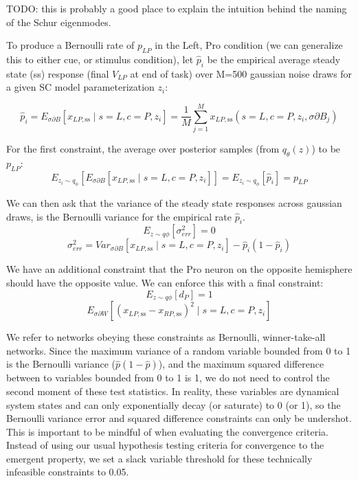 \documentclass[11pt]{article}
\begin{document}
TODO: this is probably a good place to explain the intuition behind the naming of the Schur eigenmodes.

To produce a Bernoulli rate of $p_{LP}$ in the Left, Pro condition (we can generalize this to either cue, or stimulus condition), let $\hat{p}_i$ be the empirical average steady state (ss) response (final $V_{LP}$ at end of task) over M=500 gaussian noise draws for a given SC model parameterization $z_i$:

\begin{equation}
 \hat{p}_i = E_{\sigma \partial B} \left[ x_{LP,\text{ss}} \mid s=L, c=P, z_i \right] = \frac{1}{M}\sum_{j=1}^M x_{LP,\text{ss}}(s=L, c=P, z_i, \sigma \partial B_j)
 \end{equation}

For the first constraint, the average over posterior samples (from $q_\theta(z)$) to be $p_{LP}$:
\begin{equation}
E_{z_i \sim q_\phi} \left[ E_{\sigma \partial B} \left[ x_{LP,\text{ss}} \mid s=L, c=P, z_i \right] \right] = E_{z_i \sim q_\phi} \left[ \hat{p}_i \right] = p_{LP}
\end{equation}

We can then ask that the variance of the steady state responses across gaussian draws, is the Bernoulli variance for the empirical rate $\hat{p}_i$.
\begin{equation}
E_{z \sim q\phi} \left[ \sigma^2_{err} \right] = 0
\end{equation}
\begin{equation}
\sigma^2_{err} = Var_{\sigma \partial B} \left[ x_{LP,\text{ss}} \mid s=L, c=P, z_i \right] - \hat{p}_i(1 - \hat{p}_i)
\end{equation}

We have an additional constraint that the Pro neuron on the opposite hemisphere should have the opposite value.  We can enforce this with a final constraint:
\begin{equation}
E_{z \sim q\phi} \left[ d_P \right] = 1
\end{equation}
\begin{equation}
E_{\sigma \partial W} \left[ (x_{LP,\text{ss}} - x_{RP,\text{ss}})^2  \mid s=L, c=P, z_i \right]
\end{equation}

We refer to networks obeying these constraints as Bernoulli, winner-take-all networks.  Since the maximum variance of a random variable bounded from 0 to 1 is the Bernoulli variance ($\hat{p}(1-\hat{p})$), and the maximum squared difference between to variables bounded from 0 to 1 is 1, we do not need to control the second moment of these test statistics.  In reality, these variables are dynamical system states and can only exponentially decay (or saturate) to 0 (or 1), so the Bernoulli variance error and squared difference constraints can only be undershot.  This is important to be mindful of when evaluating the convergence criteria.  Instead of using our usual hypothesis testing criteria for convergence to the emergent property, we set a slack variable threshold for these technically infeasible constraints to 0.05.
\end{document}
